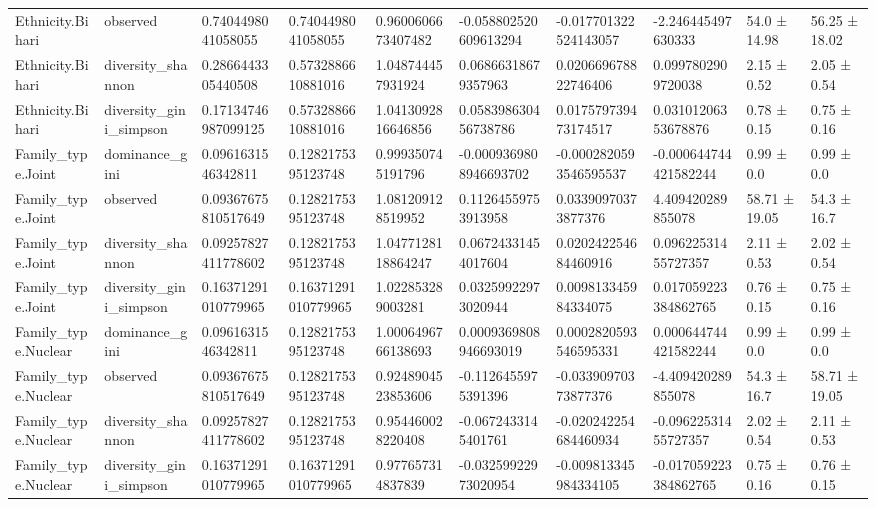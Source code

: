 \begin{longtable}{llllllllll}
Ethnicity.Bihari & observed & 0.7404498041058055 & 0.7404498041058055 & 0.9600606673407482 & -0.058802520609613294 & -0.017701322524143057 & -2.246445497630333 & 54.0 ± 14.98 & 56.25 ± 18.02 \\
Ethnicity.Bihari & diversity\_shannon & 0.2866443305440508 & 0.5732886610881016 & 1.048744457931924 & 0.06866318679357963 & 0.020669678822746406 & 0.0997802909720038 & 2.15 ± 0.52 & 2.05 ± 0.54 \\
Ethnicity.Bihari & diversity\_gini\_simpson & 0.17134746987099125 & 0.5732886610881016 & 1.0413092816646856 & 0.058398630456738786 & 0.017579739473174517 & 0.03101206353678876 & 0.78 ± 0.15 & 0.75 ± 0.16 \\
Family\_type.Joint & dominance\_gini & 0.0961631546342811 & 0.1282175395123748 & 0.999350745191796 & -0.0009369808946693702 & -0.0002820593546595537 & -0.000644744421582244 & 0.99 ± 0.0 & 0.99 ± 0.0 \\
Family\_type.Joint & observed & 0.09367675810517649 & 0.1282175395123748 & 1.081209128519952 & 0.11264559753913958 & 0.03390970373877376 & 4.409420289855078 & 58.71 ± 19.05 & 54.3 ± 16.7 \\
Family\_type.Joint & diversity\_shannon & 0.09257827411778602 & 0.1282175395123748 & 1.0477128118864247 & 0.06724331454017604 & 0.020242254684460916 & 0.09622531455727357 & 2.11 ± 0.53 & 2.02 ± 0.54 \\
Family\_type.Joint & diversity\_gini\_simpson & 0.16371291010779965 & 0.16371291010779965 & 1.022853289003281 & 0.03259922973020944 & 0.009813345984334075 & 0.017059223384862765 & 0.76 ± 0.15 & 0.75 ± 0.16 \\
Family\_type.Nuclear & dominance\_gini & 0.0961631546342811 & 0.1282175395123748 & 1.0006496766138693 & 0.0009369808946693019 & 0.0002820593546595331 & 0.000644744421582244 & 0.99 ± 0.0 & 0.99 ± 0.0 \\
Family\_type.Nuclear & observed & 0.09367675810517649 & 0.1282175395123748 & 0.9248904523853606 & -0.1126455975391396 & -0.03390970373877376 & -4.409420289855078 & 54.3 ± 16.7 & 58.71 ± 19.05 \\
Family\_type.Nuclear & diversity\_shannon & 0.09257827411778602 & 0.1282175395123748 & 0.954460028220408 & -0.0672433145401761 & -0.020242254684460934 & -0.09622531455727357 & 2.02 ± 0.54 & 2.11 ± 0.53 \\
Family\_type.Nuclear & diversity\_gini\_simpson & 0.16371291010779965 & 0.16371291010779965 & 0.977657314837839 & -0.03259922973020954 & -0.009813345984334105 & -0.017059223384862765 & 0.75 ± 0.16 & 0.76 ± 0.15 \\

\end{longtable}
